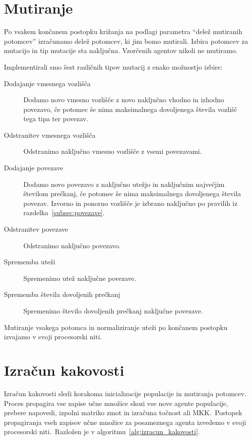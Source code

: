 \documentclass[a4paper,12pt,openright]{book}
\begin{document}
    \section{Mutiranje}\label{sec:mutiranje}
    Po vsakem končanem postopku križanja na podlagi parametra \enquote{delež mutiranih potomcev} izračunamo delež potomcev,
    ki jim bomo mutirali.
    Izbira potomcev za mutacijo in tip mutacije sta naključna. 
    Vzorčenih agentov nikoli ne mutiramo.

    Implementirali smo šest različnih tipov mutacij z enako možnostjo izbire:
    \begin{description}
        \item[Dodajanje vmesnega vozlišča]{Dodamo novo vmesno vozlišče z novo na\-klju\-čno vhodno in izhodno povezavo, če
        potomec še nima maksimalnega dovoljenega števila vozlišč tega tipa ter povezav.}
        \item[Odstranitev vmesnega vozlišča]{Odstranimo naključno vmesno vozlišče z vsemi povezavami.}
        \item[Dodajanje povezave]{Dodamo novo povezavo z naključno utežjo in naključnim največjim
        številom prečkanj, če potomec še nima maksimalnega dovoljenega števila povezav. Izvorno in ponorno vozlišče je
        izbrano naključno po pravilih iz razdelka~\ref{subsec:povezave}. }
        \item[Odstranitev povezave]{Odstranimo naključno povezavo.}
        \item[Sprememba uteži]{Spremenimo utež naključne povezave.}
        \item[Sprememba števila dovoljenih prečkanj]{Spremenimo šte\-vi\-lo dovoljenih prečkanj naključne povezave.}
    \end{description}

    Mutiranje vsakega potomca in normaliziranje uteži po končanem postopku izvajamo v svoji procesorski niti.


    \section{Izračun kakovosti}\label{sec:izracun-kakovosti}
    Izračun kakovosti sledi korakoma inicializacije populacije in mutiranja potomcev.
    Proces propagira vse zapise učne množice skozi vse nove agente populacije, prebere napovedi,
    izpolni matriko zmot in izračuna točnost ali MKK.\ Postopek propagiranja vseh zapisov učne množice za posameznega agenta izvedemo v svoji
    procesorski niti.\ Razložen je v algoritmu~\ref{alg:izracun_kakovosti}.
\end{document}
